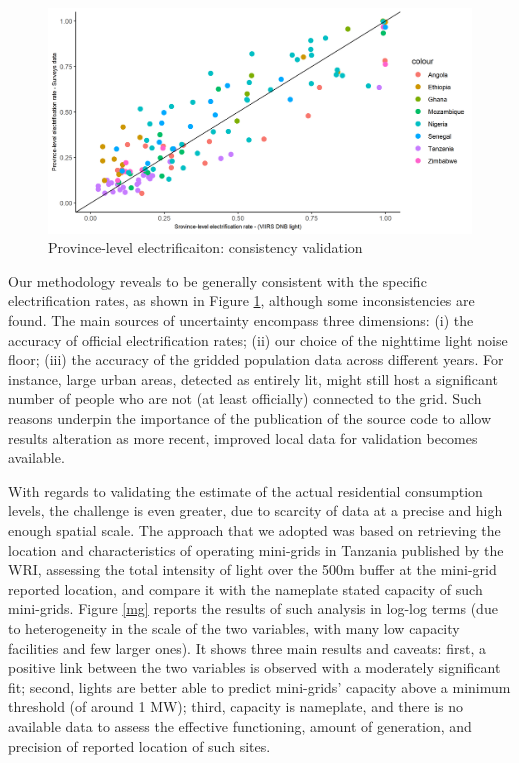 \documentclass[preprint,12pt]{elsarticle}
\begin{document}
\begin{figure}[H]
    \centering
    \includegraphics[scale=0.7]{figures/comparisontanzaniazoom.png}
    \caption{Province-level electrificaiton: consistency validation}
    \label{TanzaniaNigeriaGhana}
\end{figure}

Our methodology reveals to be generally consistent with the specific electrification rates, as shown in Figure \ref{TanzaniaNigeriaGhana}, although some inconsistencies are found. The main sources of uncertainty encompass three dimensions: (i) the accuracy of official electrification rates; (ii) our choice of the nighttime light noise floor; (iii) the accuracy of the gridded population data across different years. For instance, large urban areas, detected as entirely lit, might still host a significant number of people who are not (at least officially) connected to the grid. Such reasons underpin the importance of the publication of the source code to allow results alteration as more recent, improved local data for validation becomes available.  

With regards to validating the estimate of the actual residential consumption levels, the challenge is even greater, due to scarcity of data at a precise and high enough spatial scale. The approach that we adopted was based on retrieving the location and characteristics of operating mini-grids in Tanzania published by the WRI, assessing the total intensity of light over the 500m buffer at the mini-grid reported location, and compare it with the nameplate stated capacity of such mini-grids. Figure \ref{mg} reports the results of such analysis in log-log terms (due to heterogeneity in the scale of the two variables, with many low capacity facilities and few larger ones). It shows three main results and caveats: first, a positive link between the two variables is observed with a moderately significant  fit; second, lights are better able to predict mini-grids' capacity above a minimum threshold (of around 1 MW); third, capacity is nameplate, and there is no available data to assess the effective functioning, amount of generation, and precision of reported location of such sites.
\end{document}
